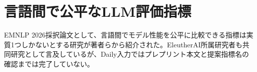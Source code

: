 \section{言語間で公平なLLM評価指標}
EMNLP 2026採択論文として、言語間でモデル性能を公平に比較できる指標は実質1つしかないとする研究が著者らから紹介された。EleutherAI所属研究者も共同研究として言及しているが、Daily入力ではプレプリント本文と提案指標名の確認までは完了していない。
